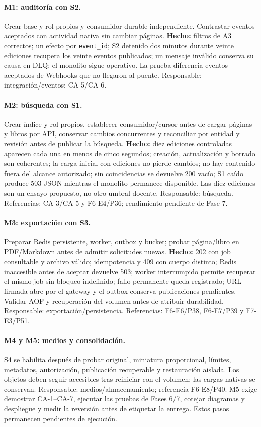 \paragraph{M1: auditoría con S2.}
Crear base y rol propios y consumidor durable independiente. Contrastar
eventos aceptados con actividad nativa sin cambiar páginas.
\textbf{Hecho:} filtros de A3 correctos; un efecto por \texttt{event\_id};
S2 detenido dos minutos durante veinte ediciones recupera los veinte eventos
publicados; un mensaje inválido conserva su causa en DLQ; el monolito sigue
operativo. La prueba diferencia eventos aceptados de Webhooks que no
llegaron al puente. Responsable: integración/eventos; CA-5/CA-6.

\paragraph{M2: búsqueda con S1.}
Crear índice y rol propios, establecer consumidor/cursor antes de cargar
páginas y libros por API, conservar cambios concurrentes y reconciliar
por entidad y revisión antes de publicar la búsqueda.
\textbf{Hecho:} diez ediciones controladas aparecen cada una en menos de
cinco segundos; creación, actualización y borrado son coherentes; la carga
inicial con ediciones no pierde cambios; no hay contenido fuera del alcance
autorizado; sin coincidencias se devuelve 200 vacío; S1 caído produce 503
JSON mientras el monolito permanece disponible. Las diez ediciones son un
ensayo propuesto, no otro umbral docente. Responsable: búsqueda.
Referencias: CA-3/CA-5 y F6-E4/P36; rendimiento pendiente de Fase 7.

\paragraph{M3: exportación con S3.}
Preparar Redis persistente, worker, outbox y bucket; probar página/libro
en PDF/Markdown antes de admitir solicitudes nuevas.
\textbf{Hecho:} 202 con job consultable y archivo válido; idempotencia y 409
con cuerpo distinto; Redis inaccesible antes de aceptar devuelve 503;
worker interrumpido permite recuperar el mismo job sin bloqueo indefinido;
fallo permanente queda registrado; URL firmada abre por el gateway y el
outbox conserva publicaciones pendientes. Validar AOF y recuperación del
volumen antes de atribuir durabilidad. Responsable: exportación/persistencia.
Referencias: F6-E6/P38, F6-E7/P39 y F7-E3/P51.

\paragraph{M4 y M5: medios y consolidación.}
S4 se habilita después de probar original, miniatura proporcional, límites,
metadatos, autorización, publicación recuperable y restauración aislada.
Los objetos deben seguir accesibles tras reiniciar con el volumen; las
cargas nativas se conservan. Responsable: medios/almacenamiento;
referencia F6-E8/P40. M5 exige demostrar CA-1--CA-7, ejecutar las pruebas
de Fases 6/7, cotejar diagramas y despliegue y medir la reversión antes de
etiquetar la entrega. Estos pasos permanecen pendientes de ejecución.

